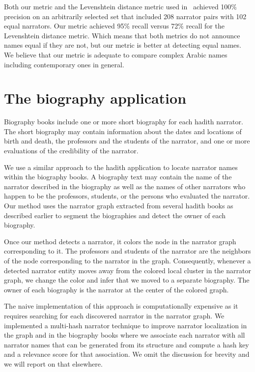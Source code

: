 \documentclass{llncs}
\begin{document}
Both our metric and the Levenshtein distance metric 
used in~\cite{Azmi-2010}
achieved 100\% precision on an arbitrarily selected set that 
included 208 narrator pairs with 102 equal narrators.
Our metric achieved 95\% recall versus 72\% recall for the 
Levenshtein distance metric. 
Which means that both metrics do not announce names equal if they
are not, but our metric is better at detecting equal names.
We believe that our metric is adequate to compare 
complex Arabic names including contemporary ones in general.

\section{The biography application}
Biography books include one or more short biography 
for each hadith narrator. 
The short biography may contain information 
about the dates and locations of birth and death, 
the professors and the students of the narrator,
and one or more evaluations of the credibility of the narrator. 

We use a similar approach to the hadith application
to locate narrator names within the biography books. 
A biography text may contain the name of the narrator described
in the biography as well as the names of other narrators who happen
to be the professors, students, or the persons who evaluated the 
narrator.
Our method uses the narrator graph 
extracted from several hadith books 
as described earlier to segment the biographies
and detect the owner of each biography. 

Once our method detects a narrator, it colors the node in  the 
narrator graph corresponding to it. 
The professors and students of the narrator
are the neighbors of the 
node corresponding to the narrator in the graph. 
Consequently, whenever a detected narrator entity 
moves away from the 
colored local cluster in the narrator graph, 
we change the color and infer that we moved to a separate
biography.
The owner of each biography is the narrator at the center of the
colored graph.

The naive implementation of this approach is computationally
expensive as it requires searching for each discovered narrator
in the narrator graph. 
We implemented a multi-hash narrator technique to 
improve narrator localization in the graph and in the biography 
books where we associate
each narrator with all narrator names that can be generated 
from its structure and compute a hash key and a relevance score 
for that association. 
We omit the discussion for brevity and we will report on that 
elsewhere. 
\end{document}
